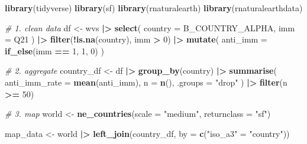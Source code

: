 \documentclass[
]{article}
\newenvironment{Shaded}{\begin{snugshade}}{\end{snugshade}}
\newcommand{\AttributeTok}[1]{\textcolor[rgb]{0.13,0.29,0.53}{#1}}
\newcommand{\CommentTok}[1]{\textcolor[rgb]{0.56,0.35,0.01}{\textit{#1}}}
\newcommand{\DecValTok}[1]{\textcolor[rgb]{0.00,0.00,0.81}{#1}}
\newcommand{\FunctionTok}[1]{\textcolor[rgb]{0.13,0.29,0.53}{\textbf{#1}}}
\newcommand{\NormalTok}[1]{#1}
\newcommand{\OtherTok}[1]{\textcolor[rgb]{0.56,0.35,0.01}{#1}}
\newcommand{\SpecialCharTok}[1]{\textcolor[rgb]{0.81,0.36,0.00}{\textbf{#1}}}
\newcommand{\StringTok}[1]{\textcolor[rgb]{0.31,0.60,0.02}{#1}}
\begin{document}
\begin{Shaded}
\begin{Highlighting}[]
\FunctionTok{library}\NormalTok{(tidyverse)}
\FunctionTok{library}\NormalTok{(sf)}
\FunctionTok{library}\NormalTok{(rnaturalearth)}
\FunctionTok{library}\NormalTok{(rnaturalearthdata)}

\CommentTok{\# 1. clean data}
\NormalTok{df }\OtherTok{\textless{}{-}}\NormalTok{ wvs }\SpecialCharTok{|\textgreater{}}
  \FunctionTok{select}\NormalTok{(}
    \AttributeTok{country =}\NormalTok{ B\_COUNTRY\_ALPHA,}
    \AttributeTok{imm =}\NormalTok{ Q21}
\NormalTok{  ) }\SpecialCharTok{|\textgreater{}}
  \FunctionTok{filter}\NormalTok{(}\SpecialCharTok{!}\FunctionTok{is.na}\NormalTok{(country), imm }\SpecialCharTok{\textgreater{}} \DecValTok{0}\NormalTok{) }\SpecialCharTok{|\textgreater{}}
  \FunctionTok{mutate}\NormalTok{(}
    \AttributeTok{anti\_imm =} \FunctionTok{if\_else}\NormalTok{(imm }\SpecialCharTok{==} \DecValTok{1}\NormalTok{, }\DecValTok{1}\NormalTok{, }\DecValTok{0}\NormalTok{)}
\NormalTok{  )}

\CommentTok{\# 2. aggregate}
\NormalTok{country\_df }\OtherTok{\textless{}{-}}\NormalTok{ df }\SpecialCharTok{|\textgreater{}}
  \FunctionTok{group\_by}\NormalTok{(country) }\SpecialCharTok{|\textgreater{}}
  \FunctionTok{summarise}\NormalTok{(}
    \AttributeTok{anti\_imm\_rate =} \FunctionTok{mean}\NormalTok{(anti\_imm),}
    \AttributeTok{n =} \FunctionTok{n}\NormalTok{(),}
    \AttributeTok{.groups =} \StringTok{"drop"}
\NormalTok{  ) }\SpecialCharTok{|\textgreater{}}
  \FunctionTok{filter}\NormalTok{(n }\SpecialCharTok{\textgreater{}=} \DecValTok{50}\NormalTok{)}

\CommentTok{\# 3. map}
\NormalTok{world }\OtherTok{\textless{}{-}} \FunctionTok{ne\_countries}\NormalTok{(}\AttributeTok{scale =} \StringTok{"medium"}\NormalTok{, }\AttributeTok{returnclass =} \StringTok{"sf"}\NormalTok{)}

\NormalTok{map\_data }\OtherTok{\textless{}{-}}\NormalTok{ world }\SpecialCharTok{|\textgreater{}}
  \FunctionTok{left\_join}\NormalTok{(country\_df, }\AttributeTok{by =} \FunctionTok{c}\NormalTok{(}\StringTok{"iso\_a3"} \OtherTok{=} \StringTok{"country"}\NormalTok{))}


\end{Highlighting}
\end{Shaded}
\end{document}
